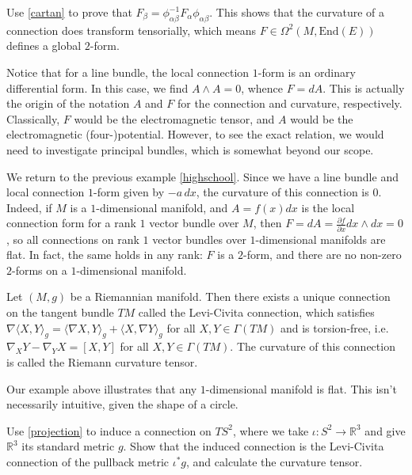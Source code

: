 \begin{exercise}
  Use \ref{cartan} to prove that $F_\beta=\phi^{-1}_{\alpha\beta}F_\alpha\phi_{\alpha\beta}$. This shows that the curvature of a connection does transform tensorially, which means $F\in\Omega^2(M,\text{End}(E))$ defines a global $2$-form.
\end{exercise}
Notice that for a line bundle, the local connection $1$-form is an ordinary differential form. In this case, we find $A\wedge A=0$, whence $F=dA$. This is actually the origin of the notation $A$ and $F$ for the connection and curvature, respectively. Classically, $F$ would be the electromagnetic tensor, and $A$ would be the electromagnetic (four-)potential. However, to see the exact relation, we would need to investigate principal bundles, which is somewhat beyond our scope.
\begin{example}
  We return to the previous example \ref{highschool}. Since we have a line bundle and local connection $1$-form given by $-a\,dx$, the curvature of this connection is $0$. Indeed, if $M$ is a $1$-dimensional manifold, and $A=f(x)dx$ is the local connection form for a rank $1$ vector bundle over $M$, then $F=dA=\frac{\partial f}{\partial x}dx\wedge dx=0$, so all connections on rank $1$ vector bundles over $1$-dimensional manifolds are flat. In fact, the same holds in any rank: $F$ is a $2$-form, and there are no non-zero $2$-forms on a $1$-dimensional manifold.
\end{example}
\begin{theorem}
  Let $(M,g)$ be a Riemannian manifold. Then there exists a unique connection on the tangent bundle $TM$ called the Levi-Civita connection, which satisfies $\nabla\langle X,Y\rangle_g=\langle\nabla X,Y\rangle_g+\langle X,\nabla Y\rangle_g$ for all $X,Y\in\Gamma(TM)$ and is torsion-free, i.e. $\nabla_XY-\nabla_YX = [X,Y]$ for all $X,Y\in\Gamma(TM)$. The curvature of this connection is called the Riemann curvature tensor.
\end{theorem}
Our example above illustrates that any $1$-dimensional manifold is flat. This isn't necessarily intuitive, given the shape of a circle.
\begin{exercise}
  Use \ref{projection} to induce a connection on $TS^2$, where we take $\iota:S^2\to\mathbb{R}^3$ and give $\mathbb{R}^3$ its standard metric $g$. Show that the induced connection is the Levi-Civita connection of the pullback metric $\iota^*g$, and calculate the curvature tensor.
\end{exercise}
